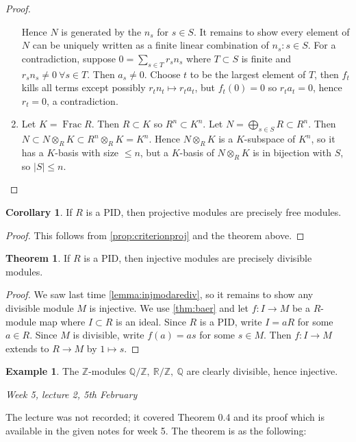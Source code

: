 \documentclass{article}
\newcommand{\Z}{\mathbb{Z}}
\newcommand{\Q}{\mathbb{Q}}
\newcommand{\R}{\mathbb{R}}
\newcommand{\Frac}{\operatorname{Frac}}
\theoremstyle{definition}
\newtheorem{thm}[defn]{Theorem}
\newtheorem{coro}[defn]{Corollary}
\newtheorem{example}[defn]{Example}
\begin{document}
\begin{proof}
\begin{enumerate}
Hence $N$ is generated by the $n_s$ for $s\in S$. It remains to show every element of $N$ can be uniquely written as a finite linear combination of $n_s:s\in S$. For a contradiction, suppose $0=\sum_{s\in T}r_sn_s$ where $T\subset S$ is finite and $r_sn_s\neq 0 \ \forall s\in T$. Then $a_s\neq 0$. Choose $t$ to be the largest element of $T$, then $f_t$ kills all terms except possibly $r_tn_t\mapsto r_ta_t$, but $f_t(0)=0$ so $r_ta_t=0$, hence $r_t=0$, a contradiction.
\item Let $K=\Frac R$. Then $R\subset K$ so $R^n\subset K^n$. Let $N=\bigoplus_{s\in S}R\subset R^n$. Then $N\subset N\otimes_R K\subset R^n\otimes_R K=K^n$. Hence $N\otimes_RK$ is a $K$-subspace of $K^n$, so it has a $K$-basis with size $\leq n$, but a $K$-basis of $N\otimes_RK$ is in bijection with $S$, so $|S|\leq n$.
\end{enumerate}
\end{proof}

\begin{coro}
\label{coro:projisfreeoverPID}
If $R$ is a PID, then projective modules are precisely free modules.
\end{coro}
\begin{proof}
This follows from \ref{prop:criterionproj} and the theorem above.
\end{proof}

\begin{thm}
\label{thm:injisdivoverPID}
If $R$ is a PID, then injective modules are precisely divisible modules.
\end{thm}
\begin{proof}
We saw last time \ref{lemma:injmodarediv}, so it remains to show any divisible module $M$ is injective. We use \ref{thm:baer} and let $f:I\rightarrow M$ be a $R$-module map where $I\subset R$ is an ideal. Since $R$ is a PID, write $I=aR$ for some $a\in R$. Since $M$ is divisible, write $f(a)=as$ for some $s\in M$. Then $f:I\rightarrow M$ extends to $R\rightarrow M$ by $1\mapsto s$.
\end{proof}

\begin{example}
The $\Z$-modules $\Q/\Z,\ \R/\Z,\ \Q$ are clearly divisible, hence injective.
\end{example}

\begin{flushright}
\textit{Week 5, lecture 2, 5th February}
\end{flushright}

The lecture was not recorded; it covered Theorem 0.4 and its proof which is available in the given notes for week 5. The theorem is as the following:
\end{document}
